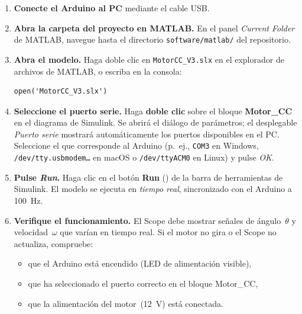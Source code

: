 \documentclass[12pt,a4paper]{article}
\begin{document}
\begin{enumerate}
  \item \textbf{Conecte el Arduino al PC} mediante el cable USB.

  \item \textbf{Abra la carpeta del proyecto en MATLAB.}
        En el panel \emph{Current Folder} de MATLAB, navegue hasta el
        directorio \texttt{software/matlab/} del repositorio.

  \item \textbf{Abra el modelo.}
        Haga doble clic en \texttt{MotorCC\_V3.slx} en el explorador de
        archivos de MATLAB, o escriba en la consola:
        \begin{lstlisting}[numbers=none]
open('MotorCC_V3.slx')
        \end{lstlisting}

  \item \textbf{Seleccione el puerto serie.}
        Haga \textbf{doble clic} sobre el bloque \textbf{Motor\_CC} en el
        diagrama de Simulink. Se abrirá el diálogo de parámetros; el
        desplegable \emph{Puerto serie} mostrará automáticamente los puertos
        disponibles en el PC. Seleccione el que corresponde al Arduino
        (p.~ej., \texttt{COM3} en Windows, \texttt{/dev/tty.usbmodem\ldots}
        en macOS o \texttt{/dev/ttyACM0} en Linux) y pulse \emph{OK}.

  \item \textbf{Pulse \emph{Run}.}
        Haga clic en el botón \textbf{Run} (\raisebox{-1pt}{\(\triangleright\)})
        de la barra de herramientas de Simulink. El modelo se ejecuta en
        \emph{tiempo real}, sincronizado con el Arduino a 100~Hz.

  \item \textbf{Verifique el funcionamiento.}
        El Scope debe mostrar señales de ángulo~$\theta$ y velocidad~$\omega$
        que varían en tiempo real. Si el motor no gira o el Scope no actualiza,
        compruebe:
        \begin{itemize}[noitemsep]
          \item que el Arduino está encendido (LED de alimentación visible),
          \item que ha seleccionado el puerto correcto en el bloque Motor\_CC,
          \item que la alimentación del motor~(12~V) está conectada.
        \end{itemize}
\end{enumerate}
\end{document}
